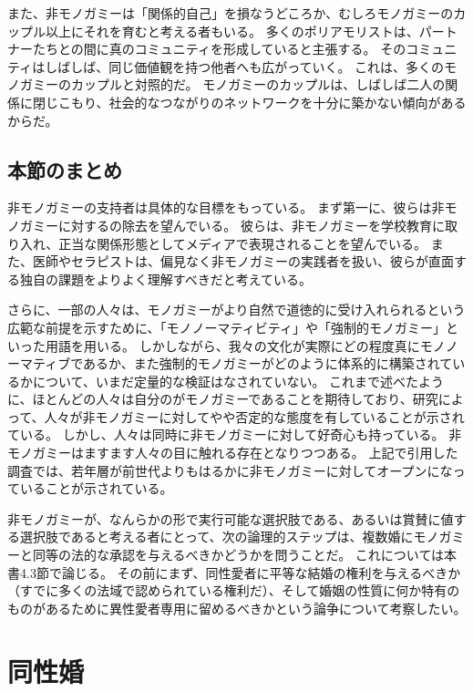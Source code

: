 \documentclass[paper=a4,book,openany]{jlreq}
\begin{document}
また、非モノガミーは「関係的自己」を損なうどころか、むしろモノガミーのカップル以上にそれを育むと考える者もいる。
多くのポリアモリストは、パートナーたちとの間に真のコミュニティを形成していると主張する。
そのコミュニティはしばしば、同じ価値観を持つ他者へも広がっていく。
これは、多くのモノガミーのカップルと対照的だ。
モノガミーのカップルは、しばしば二人の関係に閉じこもり、社会的なつながりのネットワークを十分に築かない傾向があるからだ。

\subsection{本節のまとめ}

非モノガミーの支持者は具体的な目標をもっている。
まず第一に、彼らは非モノガミーに対するの除去を望んでいる。
彼らは、非モノガミーを学校教育に取り入れ、正当な関係形態としてメディアで表現されることを望んでいる。
また、医師やセラピストは、偏見なく非モノガミーの実践者を扱い、彼らが直面する独自の課題をよりよく理解すべきだと考えている。

さらに、一部の人々は、モノガミーがより自然で道徳的に受け入れられるという広範な前提を示すために、「モノノーマティビティ」や「強制的モノガミー」といった用語を用いる。
しかしながら、我々の文化が実際にどの程度真にモノノーマティブであるか、また強制的モノガミーがどのように体系的に構築されているかについて、いまだ定量的な検証はなされていない。
これまで述べたように、ほとんどの人々は自分のがモノガミーであることを期待しており、研究によって、人々が非モノガミーに対してやや否定的な態度を有していることが示されている\citep{conley13:_fewer_merrier}。
しかし、人々は同時に非モノガミーに対して好奇心も持っている。
非モノガミーはますます人々の目に触れる存在となりつつある。
上記で引用した調査では、若年層が前世代よりもはるかに非モノガミーに対してオープンになっていることが示されている。

非モノガミーが、なんらかの形で実行可能な選択肢である、あるいは賞賛に値する選択肢であると考える者にとって、次の論理的ステップは、複数婚にモノガミーと同等の法的な承認を与えるべきかどうかを問うことだ。
これについては本書4.3節で論じる。
その前にまず、同性愛者に平等な結婚の権利を与えるべきか（すでに多くの法域で認められている権利だ）、そして婚姻の性質に何か特有のものがあるために異性愛者専用に留めるべきかという論争について考察したい。

\section{同性婚}
\end{document}
